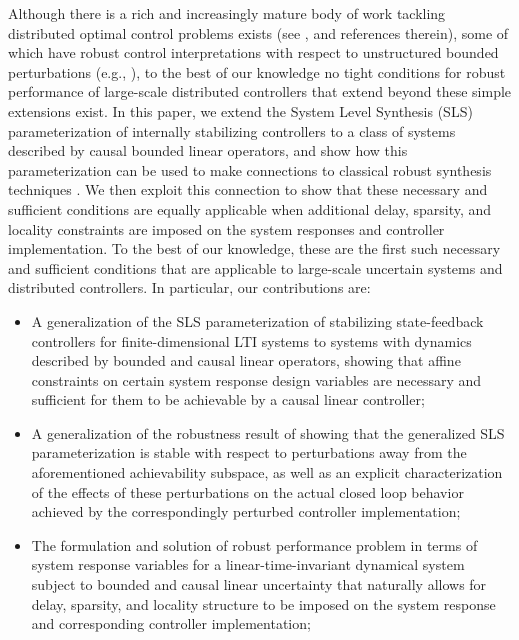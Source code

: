 Although there is a rich and increasingly mature body of work tackling distributed optimal control problems exists (see \cite{2006_Rotkowitz_QI_TAC, 2012_Mahajan_Info_survey, wang2019system,zheng2019equivalence}, and references therein), some of which have robust control interpretations with respect to unstructured bounded perturbations (e.g., \cite{matni2014distributed,lessard2014state,rosinger2017structured}), to the best of our knowledge no tight conditions for robust performance of large-scale distributed controllers that extend beyond these simple extensions exist.  In this paper, we extend the System Level Synthesis (SLS) parameterization \cite{anderson2019system,wang2019system} of internally stabilizing controllers to a class of systems described by causal bounded linear operators, and show how this parameterization can be used to make connections to classical robust synthesis techniques \cite{khammash1990stability,dahleh1994control}.  We then exploit this connection to show that these necessary and sufficient conditions are equally applicable when additional delay, sparsity, and locality constraints are imposed on the system responses and controller implementation.  To the best of our knowledge, these are the first such necessary and sufficient conditions that are applicable to large-scale uncertain systems and distributed controllers.  In particular, our contributions are:
\begin{itemize}
\item A generalization of the SLS parameterization of stabilizing state-feedback controllers for finite-dimensional LTI systems \cite{wang2019system} to systems with dynamics described by bounded and causal linear operators, showing that affine constraints on certain system response design variables are necessary and sufficient for them to be achievable by a causal linear controller;
\item A generalization of the robustness result of \cite{matni2017scalable} showing that the generalized SLS parameterization is stable with respect to perturbations away from the aforementioned achievability subspace, as well as an explicit characterization of the effects of these perturbations on the actual closed loop behavior achieved by the correspondingly perturbed controller implementation;
\item The formulation and solution of robust performance problem in terms of system response variables for a linear-time-invariant dynamical system subject to bounded and causal linear uncertainty that naturally allows for delay, sparsity, and locality structure to be imposed on the system response and corresponding controller implementation;
\end{itemize}

